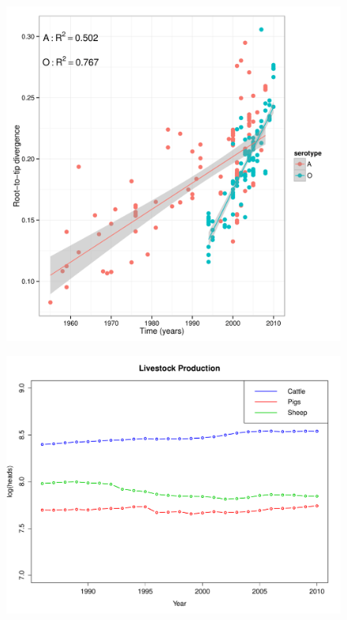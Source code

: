 \documentclass[a4paper,10pt]{article}
\begin{document}
\newpage
\begin{center}
\begin{figure}[H]
\begin{center}
\includegraphics[scale=.35]{FIGURES/rdvs.png}
\end{center}
\caption{}
\label{sfig:root-to-tip}
\end{figure}
\end{center}
\newpage
\begin{center}
\begin{figure}[H]
\begin{center}
\includegraphics[scale=.80]{FIGURES/production.pdf}
\end{center}
\caption{}
\label{sfig:prod}
\end{figure}
\end{center}
\end{document}
